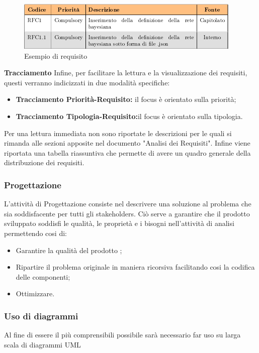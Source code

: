 \documentclass{article}
\begin{document}
    \begin{figure}[hbt!]
    	\centering
    	\includegraphics{requisiti.png}
    	\caption{Esempio di requisito}
    \end{figure}
    
    \textbf{Tracciamento} Infine, per facilitare la lettura e la visualizzazione dei requisiti, questi verranno indicizzati in due modalità specifiche:
    \begin{itemize}
    	\item \textbf{Tracciamento Priorità-Requisito:} il focus è orientato sulla priorità;
    	\item \textbf{Tracciamento Tipologia-Requisito:}il focus è orientato sulla tipologia.\newline
    \end{itemize}
    Per una lettura immediata non sono riportate le descrizioni per le quali si rimanda alle sezioni apposite nel documento "Analisi dei Requisiti".
    Infine viene riportata una tabella riassuntiva che permette di avere un quadro generale della distribuzione dei requisiti.\newline
    \subsubsection{Progettazione}
    L'attività di Progettazione consiste nel descrivere una soluzione al problema che sia soddisfacente per tutti gli stakeholders\pedice. Ciò serve a garantire che il prodotto sviluppato soddisfi le qualità, le proprietà e i bisogni nell'attività di analisi permettendo cosi di:
    \begin{itemize}
        \item Garantire la qualità del prodotto ;
        \item Ripartire il problema originale in maniera ricorsiva facilitando cosi la codifica delle componenti;
        \item Ottimizzare.
    \end{itemize}	
    \subsubsection{Uso di diagrammi}
    Al fine di essere il più comprensibili possibile sarà necessario far uso su larga scala di diagrammi UML
\newpage

\newpage

\end{document}
